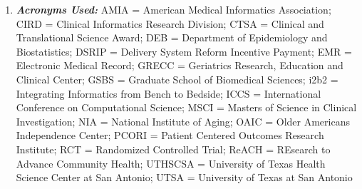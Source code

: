\begin{enumerate}
\item
  \emph{\textbf{Acronyms Used:}} AMIA = American Medical Informatics
  Association; CIRD = Clinical Informatics Research Division; CTSA =
  Clinical and Translational Science Award; DEB = Department of
  Epidemiology and Biostatistics; DSRIP = Delivery System Reform
  Incentive Payment; EMR = Electronic Medical Record; GRECC = Geriatrics
  Research, Education and Clinical Center; GSBS = Graduate School of
  Biomedical Sciences; i2b2 = Integrating Informatics from Bench to
  Bedside; ICCS = International Conference on Computational Science;
  MSCI = Masters of Science in Clinical Investigation; NIA = National
  Institute of Aging; OAIC = Older Americans Independence Center; PCORI
  = Patient Centered Outcomes Research Institute; RCT = Randomized
  Controlled Trial; ReACH = REsearch to Advance Community Health;
  UTHSCSA = University of Texas Health Science Center at San Antonio;
  UTSA = University of Texas at San Antonio

\end{enumerate}
